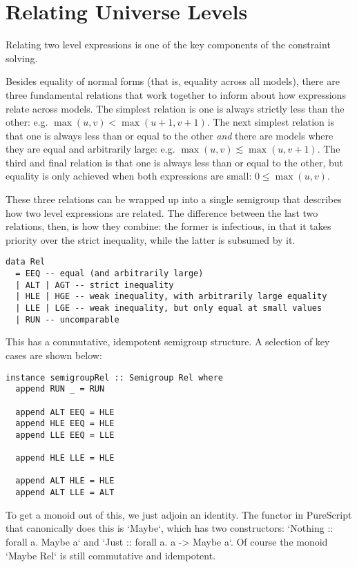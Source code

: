 \documentclass[11pt, twoside, reqno]{book}
\begin{document}
\section{Relating Universe Levels}
\label{rel-uni-lvl}

Relating two level expressions is one of the key components of the constraint solving.

Besides equality of normal forms (that is, equality across all models), there are three fundamental relations that work together to inform about how expressions relate across models.
The simplest relation is one is always strictly less than the other: e.g. \(\max(u,v) < \max(u+1,v+1)\).
The next simplest relation is that one is always less than or equal to the other \emph{and} there are models where they are equal and arbitrarily large: e.g. \(\max(u,v) \lesssim \max(u,v+1)\).
The third and final relation is that one is always less than or equal to the other, but equality is only achieved when both expressions are small: \(0 \leqslant \max(u,v)\).

These three relations can be wrapped up into a single semigroup that describes how two level expressions are related.
The difference between the last two relations, then, is how they combine: the former is infectious, in that it takes priority over the strict inequality, while the latter is subsumed by it.

\begin{verbatim}
data Rel
  = EEQ -- equal (and arbitrarily large)
  | ALT | AGT -- strict inequality
  | HLE | HGE -- weak inequality, with arbitrarily large equality
  | LLE | LGE -- weak inequality, but only equal at small values
  | RUN -- uncomparable
\end{verbatim}

This has a commutative, idempotent semigroup structure.
A selection of key cases are shown below:
\begin{verbatim}
instance semigroupRel :: Semigroup Rel where
  append RUN _ = RUN

  append ALT EEQ = HLE
  append HLE EEQ = HLE
  append LLE EEQ = LLE

  append HLE LLE = HLE

  append ALT HLE = HLE
  append ALT LLE = ALT
\end{verbatim}

To get a monoid out of this, we just adjoin an identity.
The functor in PureScript that canonically does this is \inHS`Maybe`, which has two constructors: \inHS`Nothing :: forall a. Maybe a` and \inHS`Just :: forall a. a -> Maybe a`.
Of course the monoid \inHS`Maybe Rel` is still commutative and idempotent.
\end{document}

